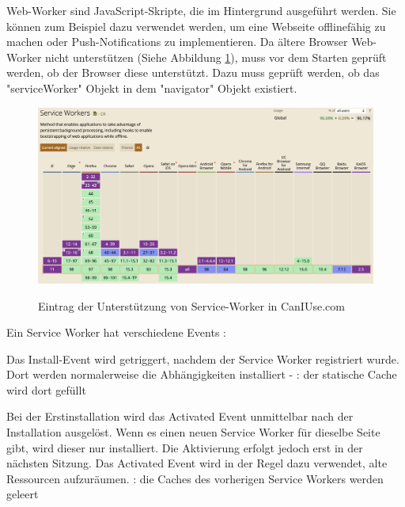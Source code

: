

Web-Worker sind JavaScript-Skripte, die im Hintergrund ausgeführt werden. 
Sie können zum Beispiel dazu verwendet werden, um eine Webseite offlinefähig zu machen oder Push-Notifications zu implementieren.
Da ältere Browser Web-Worker nicht unterstützen (Siehe Abbildung \ref{fig:CanIUseServiceWorker}), muss vor dem Starten geprüft werden, ob der Browser diese unterstützt. 
Dazu muss geprüft werden, ob das "serviceWorker" Objekt in dem "navigator" Objekt existiert. 

\begin{figure}[H]
    \centering
    \includegraphics[width=\textwidth]{media/ServiceWorker/CanIUseServiceWorker.png}
    \caption{Eintrag der Unterstützung von Service-Worker in CanIUse.com}
    \cite{ciuServiceWorker}
    \label{fig:CanIUseServiceWorker}
\end{figure}


Ein Service Worker hat verschiedene Events \cite{MDNCacheAPI}: 


Das Install-Event wird getriggert, nachdem der Service Worker registriert wurde. Dort werden normalerweise die Abhängigkeiten installiert - \zb: der statische Cache wird dort gefüllt 


Bei der Erstinstallation wird das Activated Event unmittelbar nach der Installation ausgelöst. Wenn es einen neuen Service Worker für dieselbe Seite gibt, wird dieser nur installiert. Die Aktivierung erfolgt jedoch erst in der nächsten Sitzung. Das Activated Event wird in der Regel dazu verwendet, alte Ressourcen aufzuräumen. \zb: die Caches des vorherigen Service Workers werden geleert


